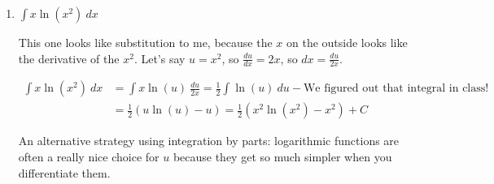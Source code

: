 \documentclass[10pt]{article}
\newenvironment{red}{\color{red}}{\ignorespacesafterend}
\newenvironment{blue}{\color{blue}}{\ignorespacesafterend}
\begin{document}
\begin{enumerate}[leftmargin=0pt]
\begin{enumerate}
    \begin{red}
    This one we'll use integration by parts, specifically because we just figured out how to integrate $x^2\cos(x^3)$. 
    \[
    \begin{array}{ll}
        u = x^3 &  \\
         & dv = x^2\cos(x^3)\ dx
    \end{array}
    \textrm{ so then }
    \begin{array}{ll}
        u = x^3 &  v = \tfrac{1}{3} \sin(x^3)\\
        du = 3x^2\ dx & dv = x^2 \cos(x^3)\ dx 
    \end{array}
    \]
    Using the integration by parts formula:
    \begin{align*}
        \int x^3\cdot (x^2\cos(x^3))\ dx &= x^3\cdot \tfrac{1}{3} \sin(x^3) - \int \tfrac{1}{3} \sin(x^3)\cdot 3x^2\ dx \\
        &= \frac13 x^3 \sin(x^3) - \int\sin(x^3)\cdot x^2\ dx
        \intertext{We'll use the substitution $t = x^3$, $dt = 3x^2\ dx$ to evaluate this second integral.}
        &= \frac13 x^3 \sin(x^3) - \int\sin(t)\ \frac{dt}{3} \\
        &= \frac13 x^3 \sin(x^3) + \frac13 \cos(t) = \frac13 x^3 \sin(x^3) + \frac13 \cos(x^3) + C
    \end{align*}
    \end{red}
    
    \item $\int x\ln(x^2)\ dx$
    
    \begin{red}
    This one looks like substitution to me, because the $x$ on the outside looks like the derivative of the $x^2$. Let's say $u = x^2$, so $\frac{du}{dx} = 2x$, so $dx = \frac{du}{2x}$.
    
    \begin{align*}
        \int x\ln(x^2)\ dx &= \int x \ln(u)\ \frac{du}{2x} = \frac12 \int\ln(u)\ du - \textrm{We figured out that integral in class!}\\
        &= \frac12\left(u\ln(u) - u\right) = \frac12\left(x^2 \ln(x^2) - x^2\right) + C
    \end{align*}
    \end{red}
    
    \begin{blue}
    An alternative strategy using integration by parts: logarithmic functions are often a really nice choice for $u$ because they get so much simpler when you differentiate them.
    

\end{blue}
\end{enumerate}
\end{enumerate}
\end{document}
